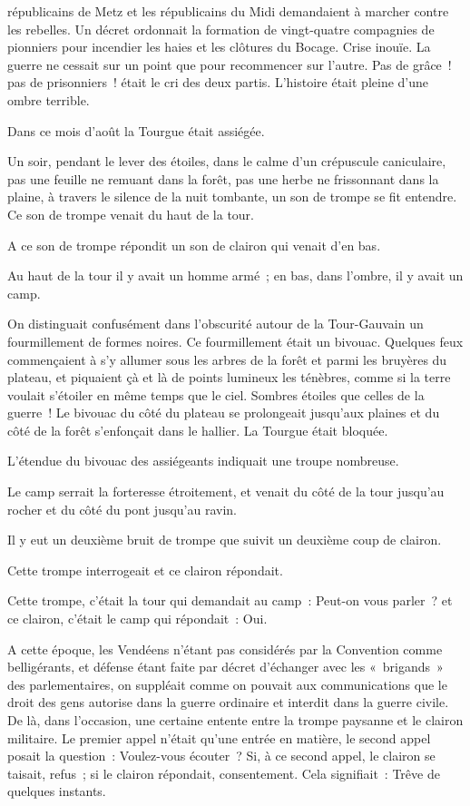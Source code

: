 \documentclass[french,twoside]{book} %
\begin{document}
républicains de Metz et les républicains du Midi demandaient à marcher contre les rebelles. Un décret ordonnait la formation de vingt-quatre compagnies de pionniers pour incendier les haies et les clôtures du Bocage. Crise inouïe. La guerre ne cessait sur un point  que pour recommencer sur l’autre. Pas de grâce ! pas de prisonniers ! était le cri des deux partis. L’histoire était pleine d’une ombre terrible.\par
Dans ce mois d’août la Tourgue était assiégée.\par
Un soir, pendant le lever des étoiles, dans le calme d’un crépuscule caniculaire, pas une feuille ne remuant dans la forêt, pas une herbe ne frissonnant dans la plaine, à travers le silence de la nuit tombante, un son de trompe se fit entendre. Ce son de trompe venait du haut de la tour.\par
A ce son de trompe répondit un son de clairon qui venait d’en bas.\par
Au haut de la tour il y avait un homme armé ; en bas, dans l’ombre, il y avait un camp.\par
On distinguait confusément dans l’obscurité autour de la Tour-Gauvain un fourmillement de formes noires. Ce fourmillement était un bivouac. Quelques feux commençaient à s’y allumer sous les arbres de la forêt et parmi les bruyères du plateau, et piquaient çà et là de points lumineux les ténèbres, comme si la terre voulait s’étoiler en même temps que le ciel. Sombres étoiles que celles de la guerre ! Le bivouac du côté du plateau se prolongeait jusqu’aux plaines et du côté de la forêt s’enfonçait dans le hallier. La Tourgue était bloquée.\par
L’étendue du bivouac des assiégeants indiquait une troupe nombreuse.\par
Le camp serrait la forteresse étroitement, et venait du côté de la tour jusqu’au rocher et du côté du pont jusqu’au ravin.\par
 Il y eut un deuxième bruit de trompe que suivit un deuxième coup de clairon.\par
Cette trompe interrogeait et ce clairon répondait.\par
Cette trompe, c’était la tour qui demandait au camp : Peut-on vous parler ? et ce clairon, c’était le camp qui répondait : Oui.\par
A cette époque, les Vendéens n’étant pas considérés par la Convention comme belligérants, et défense étant faite par décret d’échanger avec les « brigands » des parlementaires, on suppléait comme on pouvait aux communications que le droit des gens autorise dans la guerre ordinaire et interdit dans la guerre civile. De là, dans l’occasion, une certaine entente entre la trompe paysanne et le clairon militaire. Le premier appel n’était qu’une entrée en matière, le second appel posait la question : Voulez-vous écouter ? Si, à ce second appel, le clairon se taisait, refus ; si le clairon répondait, consentement. Cela signifiait : Trêve de quelques instants.\par
\end{document}
